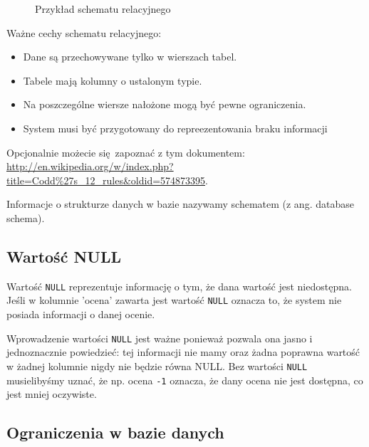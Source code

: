\documentclass[a4paper]{article}
\begin{document}
\begin{figure}
\noindent{}
\caption{Przykład schematu relacyjnego}
\end{figure}

Ważne cechy schematu relacyjnego:
%
\begin{itemize}

\item Dane są przechowywane tylko w wierszach tabel.

\item Tabele mają kolumny o ustalonym typie.

\item Na poszczególne wiersze nałożone mogą być pewne ograniczenia.

\item System musi być przygotowany do repreezentowania \textquotedbl{}braku informacji\textquotedbl{}

\end{itemize}

Opcjonalnie możecie się~zapoznać z tym dokumentem: \url{http://en.wikipedia.org/w/index.php?title=Codd\%27s_12_rules&oldid=574873395}.

Informacje o strukturze danych w bazie nazywamy
schematem (z ang. database schema).


\subsection{Wartość NULL%
  \label{wartosc-null}%
}

Wartość \texttt{NULL} reprezentuje informację o tym, że dana wartość jest niedostępna.
Jeśli w kolumnie 'ocena' zawarta jest wartość \texttt{NULL} oznacza to, że system nie posiada
informacji o danej ocenie.

Wprowadzenie wartości \texttt{NULL} jest ważne ponieważ pozwala ona jasno i jednoznacznie
powiedzieć: tej informacji nie mamy oraz żadna poprawna wartość w żadnej kolumnie
nigdy nie będzie równa NULL. Bez wartości \texttt{NULL} musielibyśmy uznać, że np. ocena
\texttt{-1} oznacza, że dany ocena nie jest dostępna, co jest mniej oczywiste.


\subsection{Ograniczenia w bazie danych%
  \label{ograniczenia-w-bazie-danych}%
}
\end{document}
